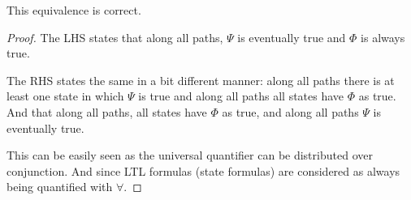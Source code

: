 \documentclass[titlepage, letterpaper, fleqn]{article}
\begin{document}
This equivalence is correct.

\begin{proof}
The LHS states that along all paths, \(\Psi\) is eventually true and \(\Phi\) is always true.

The RHS states the same in a bit different manner: along all paths there is at least one state in which \(\Psi\) is true and along all paths all states have \(\Phi\) as true. And that along all paths, all states have \(\Phi\) as true, and along all paths \(\Psi\) is eventually true.

This can be easily seen as the universal quantifier can be distributed over conjunction. And since LTL formulas (state formulas) are considered as always being quantified with \(\forall\).
\end{proof}
\end{document}

